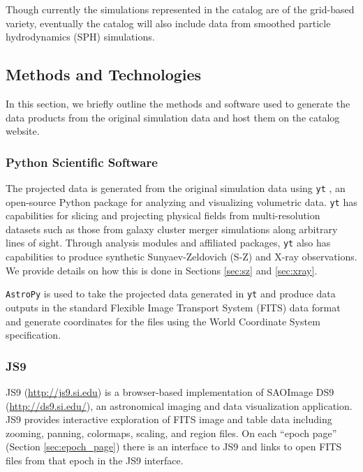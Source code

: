 \documentclass{emulateapj}
\newcommand{\code}[1]{\texttt{#1}}
\begin{document}
Though currently the simulations represented in the catalog are of the grid-based variety, eventually the catalog will also include data from smoothed particle hydrodynamics (SPH) simulations.

\subsection{Methods and Technologies}\label{sec:methods}

In this section, we briefly outline the methods and software used to generate the data products from the original simulation data and host them on the catalog website.

\subsubsection{Python Scientific Software}\label{sec:software}

The projected data is generated from the original simulation data using \code{yt} \citep{tur11}, an open-source Python package for analyzing and visualizing volumetric data. \code{yt} has capabilities for slicing and projecting physical fields from multi-resolution datasets such as those from galaxy cluster merger simulations along arbitrary lines of sight. Through analysis modules and affiliated packages, \code{yt} also has capabilities to produce synthetic Sunyaev-Zeldovich (S-Z) and X-ray observations. We provide details on how this is done in Sections \ref{sec:sz} and \ref{sec:xray}.

\code{AstroPy} \citep{apy13} is used to take the projected data generated in \code{yt} and produce data outputs in the standard Flexible Image Transport System (FITS) data format \citep{pen10} and generate coordinates for the files using the World Coordinate System \citep[WCS,][]{gre02, cal02} specification.

\subsubsection{JS9}\label{sec:js9}

JS9 (\url{http://js9.si.edu}) is a browser-based implementation of SAOImage DS9 (\url{http://ds9.si.edu/}), an astronomical imaging and data visualization application. JS9 provides interactive exploration of FITS image and table data including zooming, panning, colormaps, scaling, and region files. On each ``epoch page'' (Section \ref{sec:epoch_page}) there is an interface to JS9 and links to open FITS files from that epoch in the JS9 interface.
\end{document}

